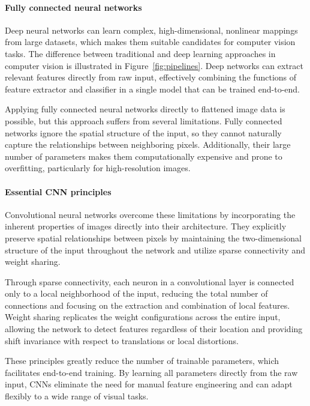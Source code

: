 \paragraph{Fully connected neural networks} Deep neural networks can learn complex, high-dimensional, nonlinear mappings from large datasets, which makes them suitable candidates for computer vision tasks. The difference between traditional and deep learning approaches in computer vision is illustrated in Figure~\ref{fig:pipelines}. Deep networks can extract relevant features directly from raw input, effectively combining the functions of feature extractor and classifier in a single model that can be trained end-to-end.

Applying fully connected neural networks directly to flattened image data is possible, but this approach suffers from several limitations. Fully connected networks ignore the spatial structure of the input, so they cannot naturally capture the relationships between neighboring pixels. Additionally, their large number of parameters makes them computationally expensive and prone to overfitting, particularly for high-resolution images.~\cite{Lecun1998}

\paragraph{Essential CNN principles} Convolutional neural networks overcome these limitations by incorporating the inherent properties of images directly into their architecture. They explicitly preserve spatial relationships between pixels by maintaining the two-dimensional structure of the input throughout the network and utilize sparse connectivity and weight sharing.

Through sparse connectivity, each neuron in a convolutional layer is connected only to a local neighborhood of the input, reducing the total number of connections and focusing on the extraction and combination of local features. Weight sharing replicates the weight configurations across the entire input, allowing the network to detect features regardless of their location and providing shift invariance with respect to translations or local distortions.

These principles greatly reduce the number of trainable parameters, which facilitates end-to-end training. By learning all parameters directly from the raw input, CNNs eliminate the need for manual feature engineering and can adapt flexibly to a wide range of visual tasks.~\cite{Lecun1998}



